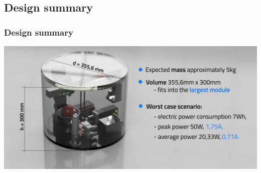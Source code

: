 \documentclass[xcolor=dvipsnames]{beamer}%
\begin{document}
\subsection{Design summary}
\begin{frame}
\frametitle{Design summary}
  \centering
  \includegraphics[width=\linewidth]{figure/Modul_SUMMARY.pdf}
\end{frame}
\end{document}
